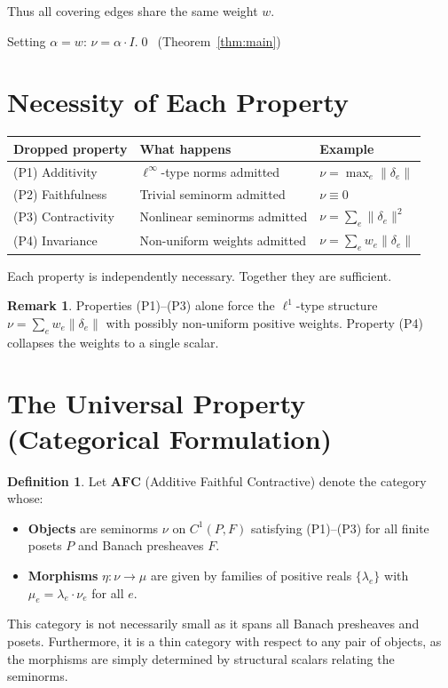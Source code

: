 \documentclass[11pt,a4paper]{amsart}
\theoremstyle{plain}
\theoremstyle{definition}
\newtheorem{definition}[theorem]{Definition}
\newtheorem{remark}[theorem]{Remark}
\begin{document}
Thus all covering edges share the same weight $w$.

Setting $\alpha = w$: $\nu = \alpha \cdot I$.\qed\ (Theorem~\ref{thm:main})

\section{Necessity of Each Property}

\begin{center}
\begin{tabular}{@{}lll@{}}
\toprule
Dropped property & What happens & Example \\
\midrule
(P1) Additivity & $\ell^\infty$-type norms admitted & $\nu = \max_e \|\delta_e\|$ \\
(P2) Faithfulness & Trivial seminorm admitted & $\nu \equiv 0$ \\
(P3) Contractivity & Nonlinear seminorms admitted & $\nu = \sum_e \|\delta_e\|^2$ \\
(P4) Invariance & Non-uniform weights admitted & $\nu = \sum_e w_e \|\delta_e\|$ \\
\bottomrule
\end{tabular}
\end{center}

Each property is independently necessary. Together they are sufficient.

\begin{remark}
Properties \textup{(P1)--(P3)} alone force the $\ell^1$-type structure $\nu = \sum_e w_e \|\delta_e\|$ with possibly non-uniform positive weights. Property \textup{(P4)} collapses the weights to a single scalar.
\end{remark}

\section{The Universal Property (Categorical Formulation)}

\begin{definition}\label{def:afc}
Let $\mathbf{AFC}$ (Additive Faithful Contractive) denote the category whose:
\begin{itemize}[nosep]
  \item \textbf{Objects} are seminorms $\nu$ on $C^1(P, F)$ satisfying \textup{(P1)--(P3)} for all finite posets $P$ and Banach presheaves $F$.
  \item \textbf{Morphisms} $\eta: \nu \to \mu$ are given by families of positive reals $\{\lambda_e\}$ with $\mu_e = \lambda_e \cdot \nu_e$ for all $e$.
\end{itemize}
This category is not necessarily small as it spans all Banach presheaves and posets. Furthermore, it is a thin category with respect to any pair of objects, as the morphisms are simply determined by structural scalars relating the seminorms.
\end{definition}
\end{document}
